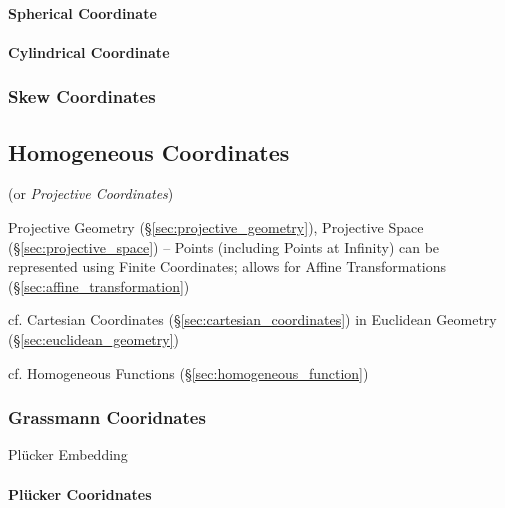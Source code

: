 \paragraph{Spherical Coordinate}\label{sec:spherical_coordinates}\hfill

\paragraph{Cylindrical Coordinate}\label{sec:cylindrical_coordinates}\hfill



\subsubsection{Skew Coordinates}\label{sec:skew_coordinates}



\subsection{Homogeneous Coordinates}\label{sec:homogeneous_coordinates}

(or \emph{Projective Coordinates})

Projective Geometry (\S\ref{sec:projective_geometry}), Projective
Space (\S\ref{sec:projective_space}) -- Points (including Points at
Infinity) can be represented using Finite Coordinates; allows for
Affine Transformations (\S\ref{sec:affine_transformation})

\fist cf. Cartesian Coordinates (\S\ref{sec:cartesian_coordinates}) in
Euclidean Geometry (\S\ref{sec:euclidean_geometry})

\fist cf. Homogeneous Functions (\S\ref{sec:homogeneous_function})



\subsubsection{Grassmann Cooridnates}\label{sec:grassmann_coordinates}

Pl\"ucker Embedding



\paragraph{Pl\"ucker Cooridnates}\label{sec:plucker_coordinates}\hfill



